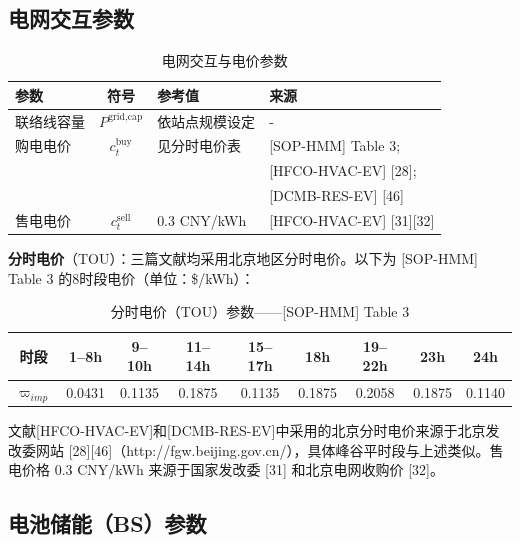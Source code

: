 \documentclass[11pt]{ctexart}
\begin{document}
\subsection{电网交互参数}

\begin{table}[htbp]
\centering
\caption{电网交互与电价参数}
\begin{tabular}{lcll}
\hline
参数 & 符号 & 参考值 & 来源 \\
\hline
联络线容量 & $P^{\text{grid,cap}}$ & 依站点规模设定 & - \\
购电电价 & $c_{t}^{\text{buy}}$ & 见分时电价表 & {[SOP-HMM]} Table 3; \\
 & & & {[HFCO-HVAC-EV]} {[28]}; \\
 & & & {[DCMB-RES-EV]} {[46]} \\
售电电价 & $c_{t}^{\text{sell}}$ & 0.3 CNY/kWh & {[HFCO-HVAC-EV]} {[31]}{[32]} \\
\hline
\end{tabular}
\end{table}

\textbf{分时电价}（TOU）：三篇文献均采用北京地区分时电价。以下为 {[SOP-HMM]} Table 3 的8时段电价（单位：\$/kWh）：

\begin{table}[htbp]
\centering
\caption{分时电价（TOU）参数——{[SOP-HMM]} Table 3}
\begin{tabular}{ccccccccc}
\hline
时段 & 1--8h & 9--10h & 11--14h & 15--17h & 18h & 19--22h & 23h & 24h \\
\hline
$\varpi_{imp}$ & 0.0431 & 0.1135 & 0.1875 & 0.1135 & 0.1875 & 0.2058 & 0.1875 & 0.1140 \\
\hline
\end{tabular}
\end{table}

文献{[HFCO-HVAC-EV]}和{[DCMB-RES-EV]}中采用的北京分时电价来源于北京发改委网站 {[28]}{[46]}（http://fgw.beijing.gov.cn/），具体峰谷平时段与上述类似。售电价格 0.3 CNY/kWh 来源于国家发改委 {[31]} 和北京电网收购价 {[32]}。

\subsection{电池储能（BS）参数}
\end{document}
